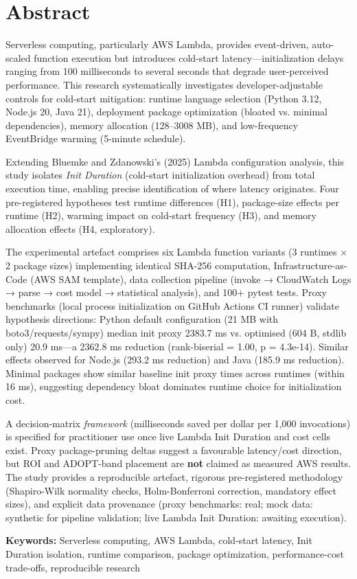 \chapter*{Abstract}

Serverless computing, particularly AWS Lambda, provides event-driven, auto-scaled function execution but introduces cold-start latency—initialization delays ranging from 100 milliseconds to several seconds that degrade user-perceived performance. This research systematically investigates developer-adjustable controls for cold-start mitigation: runtime language selection (Python 3.12, Node.js 20, Java 21), deployment package optimization (bloated vs. minimal dependencies), memory allocation (128–3008 MB), and low-frequency EventBridge warming (5-minute schedule).

Extending Bluemke and Zdanowski's (2025) Lambda configuration analysis, this study isolates \textit{Init Duration} (cold-start initialization overhead) from total execution time, enabling precise identification of where latency originates. Four pre-registered hypotheses test runtime differences (H1), package-size effects per runtime (H2), warming impact on cold-start frequency (H3), and memory allocation effects (H4, exploratory).

The experimental artefact comprises six Lambda function variants (3 runtimes × 2 package sizes) implementing identical SHA-256 computation, Infrastructure-as-Code (AWS SAM template), data collection pipeline (invoke → CloudWatch Logs → parse → cost model → statistical analysis), and 100+ pytest tests. Proxy benchmarks (local process initialization on GitHub Actions CI runner) validate hypothesis directions: Python default configuration (21 MB with boto3/requests/sympy) median init proxy 2383.7 ms vs. optimised (604 B, stdlib only) 20.9 ms—a 2362.8 ms reduction (rank-biserial = 1.00, p = 4.3e-14). Similar effects observed for Node.js (293.2 ms reduction) and Java (185.9 ms reduction). Minimal packages show similar baseline init proxy times across runtimes (within 16 ms), suggesting dependency bloat dominates runtime choice for initialization cost.

A decision-matrix \textit{framework} (milliseconds saved per dollar per 1{,}000 invocations) is specified for practitioner use once live Lambda Init Duration and cost cells exist. Proxy package-pruning deltas suggest a favourable latency/cost direction, but ROI and ADOPT-band placement are \textbf{not} claimed as measured AWS results. The study provides a reproducible artefact, rigorous pre-registered methodology (Shapiro-Wilk normality checks, Holm-Bonferroni correction, mandatory effect sizes), and explicit data provenance (proxy benchmarks: real; mock data: synthetic for pipeline validation; live Lambda Init Duration: awaiting execution).

\textbf{Keywords:} Serverless computing, AWS Lambda, cold-start latency, Init Duration isolation, runtime comparison, package optimization, performance-cost trade-offs, reproducible research
